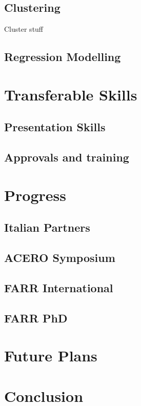 \documentclass[bsc]{abdnthesis}
\begin{document}
\section{Clustering} %
\label{sec:clustering}
Cluster stuff
\section{Regression Modelling} %
\label{sec:regression_modelling}



\chapter{Transferable Skills}
\section{Presentation Skills} %
\label{sec:presentation_skills}

\section{Approvals and training} %
\label{sec:approvals_and_training}



\chapter{Progress}
\section{Italian Partners} %
\label{sec:italian_partners}

\section{ACERO Symposium} %
\label{sec:acero_symposium}

\section{FARR International} %
\label{sec:farr_international}

\section{FARR PhD} %
\label{sec:farr_phd}



\chapter{Future Plans}


\chapter{Conclusion}







\end{document}
